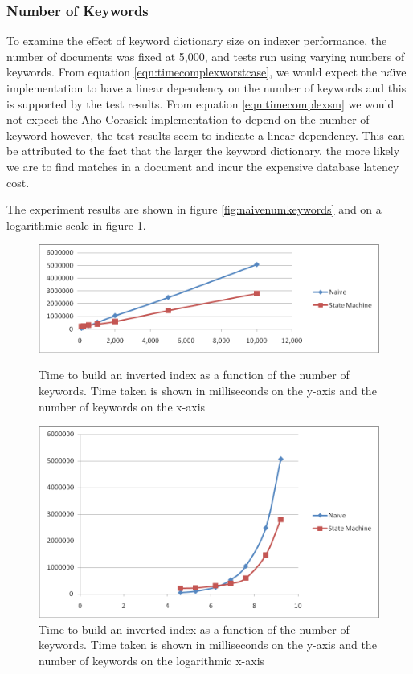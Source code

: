 \documentclass[10pt]{article}
\begin{document}
\subsubsection{Number of Keywords}
To examine the effect of keyword dictionary size on indexer
performance, the number of documents was fixed at 5,000, and tests run
using varying numbers of keywords. From equation
\ref{eqn:timecomplexworstcase}, we would expect the na\"{\i}ve
implementation to have a linear dependency on the number of keywords
and this is supported by the test results. From equation
\ref{eqn:timecomplexsm} we would not expect the Aho-Corasick
implementation to depend on the number of keyword however, the test
results seem to indicate a linear dependency. This can be attributed
to the fact that the larger the keyword dictionary, the more likely we
are to find matches in a document and incur the expensive database
latency cost.

The experiment results are shown in figure \ref{fig:naivenumkeywords}
and on a logarithmic scale in figure \ref{fig:naivenumkeywordslog}.


\begin{figure}[ht]
  \begin{minipage}[b]{0.5\linewidth}
    \centering
    \includegraphics[width=\textwidth]{naivenumkeywords}
    \caption{Time to build an inverted index as a function of the
      number of keywords. Time taken is shown in milliseconds on the
      y-axis and the number of keywords on the x-axis}
    \label{fig:naivenumkeywords}
  \end{minipage}
  \hspace{0.5cm}
  \begin{minipage}[b]{0.5\linewidth}
    \centering
    \includegraphics[width=\textwidth]{naivenumkeywordslog}
    \caption{Time to build an inverted index as a function of the
      number of keywords. Time taken is shown in milliseconds on the
      y-axis and the number of keywords on the logarithmic x-axis}
    \label{fig:naivenumkeywordslog}
  \end{minipage}
\end{figure}
\end{document}
